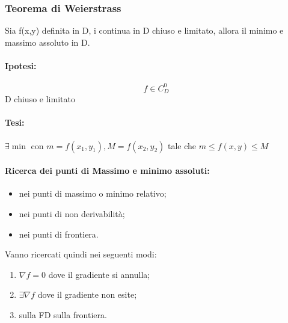 \subsubsection{Teorema di Weierstrass}
\begin{teorema}
	Sia f(x,y) definita in D, i continua in D chiuso e limitato, allora il
	minimo e massimo assoluto in D.
	\begin{multicols}{2}
		\paragraph{Ipotesi:}
		\begin{equation*}
			f\in C^0_D
		\end{equation*}
		D chiuso e limitato
		\paragraph{Tesi:}
		$\exists\min$ con $m=f(x_1,y_1), M=f(x_2,y_2)$ tale che $m\leq
		f(x,y)\leq M$
	\end{multicols}
	\paragraph{Ricerca dei punti di Massimo e minimo assoluti:}
	\begin{itemize}
		\item nei punti di massimo o minimo relativo;
		\item nei punti di non derivabilità;
		\item nei punti di frontiera.
	\end{itemize}
	Vanno ricercati quindi nei seguenti modi:
	\begin{enumerate}
		\item $\nabla f=0$ dove il gradiente si annulla;
		\item $\exists \nabla f$ dove il gradiente non esite;
		\item sulla FD sulla frontiera.
	\end{enumerate}
\end{teorema}
